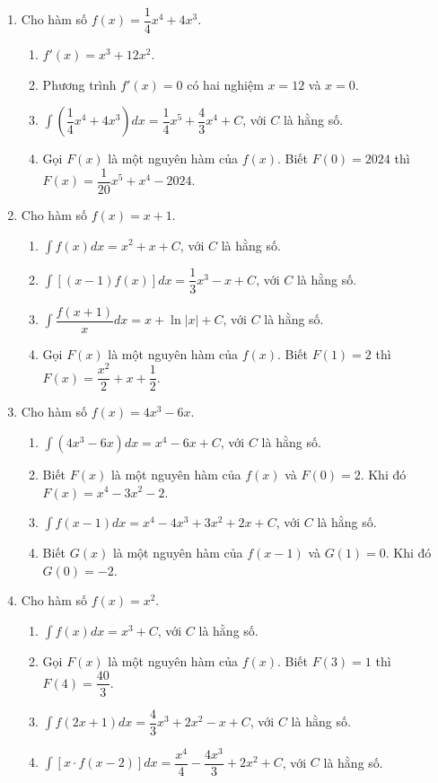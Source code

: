 \documentclass[12pt]{article}
\begin{document}
	\begin{enumerate}[label=\textbf{Câu \arabic*.}, start=1]
		
		\item Cho hàm số $f(x) = \dfrac{1}{4}x^4 + 4x^3$.
		\begin{enumerate}[label=\alph*)]
			\item $f'(x) = x^3 + 12x^2$.
			\item Phương trình $f'(x) = 0$ có hai nghiệm $x = 12$ và $x = 0$.
			\item $\displaystyle \int \left( \dfrac{1}{4}x^4 + 4x^3 \right) dx = \dfrac{1}{4}x^5 + \dfrac{4}{3}x^4 + C$, với $C$ là hằng số.
			\item Gọi $F(x)$ là một nguyên hàm của $f(x)$. Biết $F(0) = 2024$ thì $F(x) = \dfrac{1}{20}x^5 + x^4 - 2024$.
		\end{enumerate}
		
		\item Cho hàm số $f(x) = x + 1$.
		\begin{enumerate}[label=\alph*)]
			\item $\displaystyle \int f(x) dx = x^2 + x + C$, với $C$ là hằng số.
			\item $\displaystyle \int [(x - 1)f(x)] dx = \dfrac{1}{3}x^3 - x + C$, với $C$ là hằng số.
			\item $\displaystyle \int \dfrac{f(x+1)}{x} dx = x + \ln|x| + C$, với $C$ là hằng số.
			\item Gọi $F(x)$ là một nguyên hàm của $f(x)$. Biết $F(1) = 2$ thì $F(x) = \dfrac{x^2}{2} + x + \dfrac{1}{2}$.
		\end{enumerate}
		
		\item Cho hàm số $f(x) = 4x^3 - 6x$.
		\begin{enumerate}[label=\alph*)]
			\item $\displaystyle \int (4x^3 - 6x) dx = x^4 - 6x + C$, với $C$ là hằng số.
			\item Biết $F(x)$ là một nguyên hàm của $f(x)$ và $F(0) = 2$. Khi đó $F(x) = x^4 - 3x^2 - 2$.
			\item $\displaystyle \int f(x-1) dx = x^4 - 4x^3 + 3x^2 + 2x + C$, với $C$ là hằng số.
			\item Biết $G(x)$ là một nguyên hàm của $f(x-1)$ và $G(1) = 0$. Khi đó $G(0) = -2$.
		\end{enumerate}
		
		\item Cho hàm số $f(x) = x^2$.
		\begin{enumerate}[label=\alph*)]
			\item $\displaystyle \int f(x) dx = x^3 + C$, với $C$ là hằng số.
			\item Gọi $F(x)$ là một nguyên hàm của $f(x)$. Biết $F(3) = 1$ thì $F(4) = \dfrac{40}{3}$.
			\item $\displaystyle \int f(2x+1) dx = \dfrac{4}{3}x^3 + 2x^2 - x + C$, với $C$ là hằng số.
			\item $\displaystyle \int [x \cdot f(x-2)] dx = \dfrac{x^4}{4} - \dfrac{4x^3}{3} + 2x^2 + C$, với $C$ là hằng số.
		\end{enumerate}
		

\end{enumerate}
\end{document}
